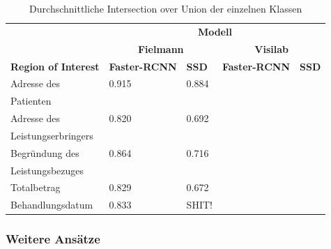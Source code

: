 \begin{table}[h!]
\label{tab:specific-ie-iou}
\centering
    \captionsetup{width=.9\linewidth}
    \caption{Durchschnittliche Intersection over Union der einzelnen Klassen}
    \begin{tabular}{|l|l|l|l|l|}
    \hhline{~|----|}    
    \multicolumn{1}{c|}{}
                                    & \multicolumn{4}{c|}{\cellcolor[HTML]{DDDDDD}\textbf{Modell}}  \\
    \hhline{~|--|--|}
    \multicolumn{1}{c|}{}
                                    & \multicolumn{2}{c|}{\cellcolor[HTML]{DDDDDD}\textbf{Fielmann}} 
                                                            & \multicolumn{2}{c|}{\cellcolor[HTML]{DDDDDD}\textbf{Visilab}} \\
    \hline
    \rowcolor[HTML]{DDDDDD}     
    \textbf{Region of Interest}     & \textbf{Faster-RCNN}  & \textbf{SSD}        & \textbf{Faster-RCNN}  & \textbf{SSD} \\
    \hline
    Adresse des                     & 0.915    & 0.884      & & \\
    Patienten &&&& \\
    \hline
    Adresse des                     & 0.820    & 0.692      & & \\
    Leistungserbringers &&&& \\
    \hline
    Begründung des                  & 0.864    & 0.716      & & \\
    Leistungsbezuges &&&& \\
    \hline
    Totalbetrag                     & 0.829    & 0.672      & & \\
    \hline
    Behandlungsdatum                & 0.833    & SHIT!      & & \\
    \hline
    \end{tabular}
\end{table}


\subsubsection{Weitere Ansätze}


